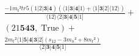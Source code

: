 \documentclass[varwidth, border=5pt]{standalone}
\begin{document}
\begin{my}
$\begin{gathered}
\scriptscriptstyle\frac{-1m_t²tr5(1|2|𝟑|𝟒)(⟨1|𝟑|𝟒|1⟩+⟨1|𝟑|2]⟨12⟩)}{⟨12⟩⟨2|𝟑|𝟒|𝟓|1]} +\\
\scriptscriptstyle(21𝟓𝟒𝟑,\;\text{True}) +\\
\scriptscriptstyle\frac{2m_t²⟨1|𝟓|𝟒|𝟑|2](s_{12}-3m_h²+8m_t²)}{⟨2|𝟑|𝟒|𝟓|1]} \phantom{+}
\end{gathered}$
\end{my}
\end{document}
